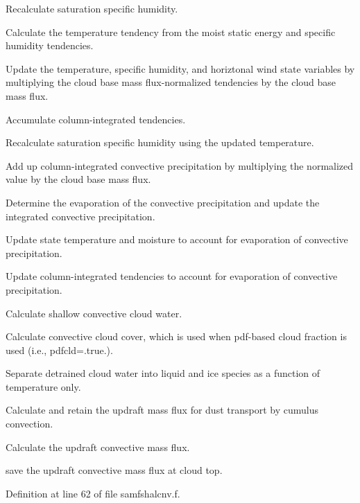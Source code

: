\begin{DoxyItemize}
\item Recalculate saturation specific humidity.
\item Calculate the temperature tendency from the moist static energy and specific humidity tendencies.
\item Update the temperature, specific humidity, and horiztonal wind state variables by multiplying the cloud base mass flux-\/normalized tendencies by the cloud base mass flux.
\item Accumulate column-\/integrated tendencies.
\item Recalculate saturation specific humidity using the updated temperature.
\item Add up column-\/integrated convective precipitation by multiplying the normalized value by the cloud base mass flux.
\item Determine the evaporation of the convective precipitation and update the integrated convective precipitation.
\item Update state temperature and moisture to account for evaporation of convective precipitation.
\item Update column-\/integrated tendencies to account for evaporation of convective precipitation.
\item Calculate shallow convective cloud water.
\item Calculate convective cloud cover, which is used when pdf-\/based cloud fraction is used (i.\+e., pdfcld=.true.).
\item Separate detrained cloud water into liquid and ice species as a function of temperature only.
\item Calculate and retain the updraft mass flux for dust transport by cumulus convection.
\item Calculate the updraft convective mass flux.
\item save the updraft convective mass flux at cloud top. 
\end{DoxyItemize}

Definition at line 62 of file samfshalcnv.\+f.

